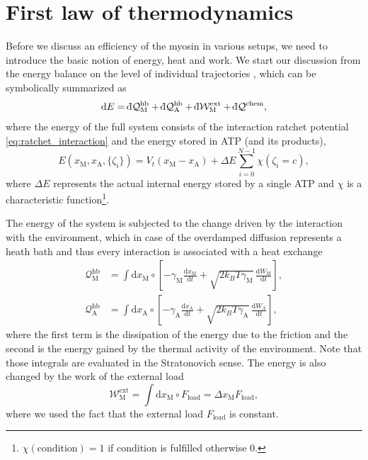 \documentclass[aps,pre,twocolumn,showpacs,showkeys,superscriptaddress,floatfix]{revtex4-1}
\newcommand{\rmd}{{\mathrm d}}
\newcommand{\dbar}{{\mathchar '26 \mkern-11mu {\mathrm d}}}
\begin{document}
\section{First law of thermodynamics}
\label{sec:energie}
Before we discuss an efficiency of the myosin in various setups, 
we need to introduce the basic notion of energy, heat and work. 
We start our discussion from the energy balance on the level of individual trajectories \cite{Pesek2013},
which can be symbolically summarized as 
\begin{equation}
\rmd E = \dbar {\mathcal Q}_\text{M}^\text{hb} + \dbar {\mathcal Q}_\text{A}^\text{hb} + \dbar {\mathcal W}^\text{ext}_\text{M} + \dbar {\mathcal Q}^\text{chem}, 
\label{eq:energy_balance}
\end{equation}
where the energy of the full system consists of the interaction ratchet potential \eqref{eq:ratchet_interaction}
and the energy stored in ATP (and its products), 
\begin{equation}
E( x_\text{M}, x_\text{A}, \{ \zeta_i \}) = V_t( x_\text{M} - x_\text{A} ) + \Delta E \sum\limits_{i=0}^{N-1} \chi( \zeta_i = c ) ,
\label{eq:internal_energy}
\end{equation}
where $\Delta E$ represents the actual internal energy stored by a single ATP and $\chi$ is a characteristic function\footnote{
$\chi(\text{condition}) = 1$ if condition is fulfilled otherwise $0$.
}.

The energy of the system is subjected to the change driven by the interaction with the environment, 
which in case of the overdamped diffusion represents a heath bath 
and thus every interaction is associated with a heat exchange \cite{Pesek2013}
\begin{align}
{\mathcal Q}_\text{M}^\text{hb} 
&= \int \rmd x_\text{M} \circ \left[ - \gamma_\text{M} \frac{\rmd x_\text{M} }{\rmd t} + \sqrt{ 2 k_B T \gamma_\text{M} } \, \frac{ \rmd W_\text{M} }{ \rmd t } \right] , 
\label{eq:heat_hb_M} \\
{\mathcal Q}_\text{A}^\text{hb} 
&= \int \rmd x_\text{A} \circ \left[ - \gamma_\text{A} \frac{\rmd x_\text{A} }{\rmd t} + \sqrt{ 2 k_B T \gamma_\text{A} } \, \frac{ \rmd W_\text{A} }{ \rmd t } \right] ,
\label{eq:heat_hb_A}
\end{align} 
where the first term is the dissipation of the energy due to the friction and the second is the energy gained by the thermal activity of the environment. 
Note that those integrals are evaluated in the Stratonovich sense.
The energy is also changed by the work of the external load 
\begin{equation}
{\mathcal W}^\text{ext}_\text{M} = \int \rmd x_\text{M} \circ F_\text{load} = \Delta x_\text{M} F_\text{load}, 
\label{eq:work_load}
\end{equation}
where we used the fact that the external load $F_\text{load}$ is constant. 
\end{document}
